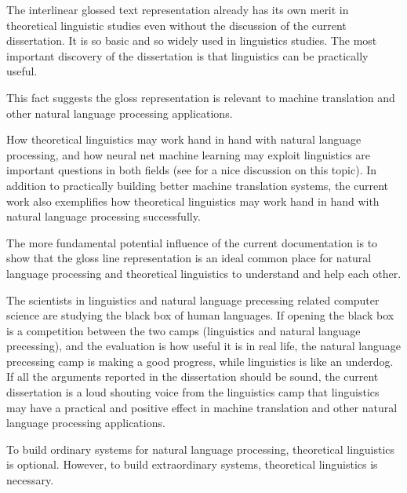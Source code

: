 \documentclass[final]{ua-thesis}
\numberwithin{equation}{section}
\begin{document}
The interlinear glossed text representation already has its own merit in theoretical linguistic studies even without the discussion of the current dissertation. It is so basic and so widely used in linguistics studies. The most important discovery of the dissertation is that linguistics can be practically useful.

This fact suggests the gloss representation is relevant to machine translation and other natural language processing applications. 

How theoretical linguistics may work hand in hand with natural language processing, and how neural net machine learning may exploit linguistics are important questions in both fields (see \citet{pater2017generative} for a nice discussion on this topic). In addition to practically building better machine translation systems, the current work also exemplifies how theoretical linguistics may work hand in hand with natural language processing successfully.

The more fundamental potential influence of the current documentation is to show that the gloss line representation is an ideal common place for natural language processing and theoretical linguistics to understand and help each other. 

The scientists in linguistics and natural language precessing related computer science are studying the black box of human languages. 
If opening the black box is a competition between the two camps (linguistics and natural language precessing), and the evaluation is how useful it is in real life, the natural language precessing camp is making a good progress, while linguistics is like an underdog. 
If all the arguments reported in the dissertation should be sound, the current dissertation is a loud shouting voice from the linguistics camp that linguistics may have a practical and positive effect in machine translation and other natural language processing applications. 

To build ordinary systems for natural language processing, theoretical linguistics is optional. However, to build extraordinary systems, theoretical linguistics is necessary.







\end{document}
